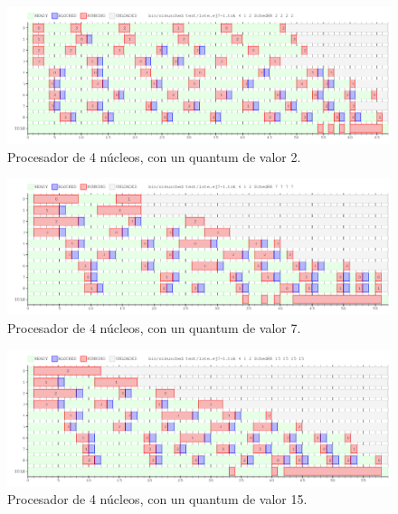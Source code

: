 \documentclass[a4paper]{article}
\begin{document}
\begin{figure}[H]
\begin{center}
\includegraphics[scale=0.4]{imagenes/ej7-1-c-4-q-2.png}
\end{center}
\caption{Procesador de 4 núcleos, con un quantum de valor 2.}
\end{figure}

\begin{figure}[H]
\begin{center}
\includegraphics[scale=0.4]{imagenes/ej7-1-c-4-q-7.png}
\end{center}
\caption{Procesador de 4 núcleos, con un quantum de valor 7.}

\end{figure}

\begin{figure}[H]
\begin{center}
\includegraphics[scale=0.4]{imagenes/ej7-1-c-4-q-15.png}
\end{center}
\caption{Procesador de 4 núcleos, con un quantum de valor 15.}
\end{figure}
\end{document}
